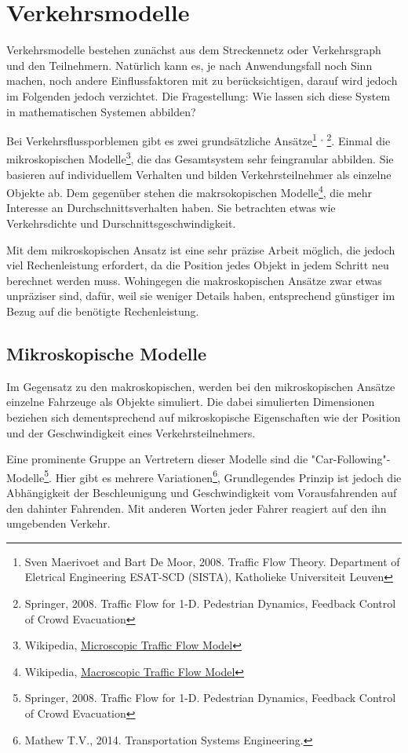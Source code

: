\section{Verkehrsmodelle}

Verkehrsmodelle bestehen zunächst aus dem Streckennetz oder Verkehrsgraph und den Teilnehmern. Natürlich kann es, je nach Anwendungsfall noch Sinn machen, noch andere Einflussfaktoren mit zu berücksichtigen, darauf wird jedoch im Folgenden jedoch verzichtet. Die Fragestellung: Wie lassen sich diese System in mathematischen Systemen abbilden?

Bei Verkehrsflussporblemen gibt es zwei grundsätzliche Ansätze\footnote{Sven Maerivoet and Bart De Moor, 2008. Traffic Flow Theory. Department of Eletrical Engineering ESAT-SCD (SISTA), Katholieke Universiteit Leuven}
\textsuperscript{,}
\footnote{Springer, 2008. Traffic Flow for 1-D. Pedestrian Dynamics, Feedback Control of Crowd Evacuation}. Einmal die mikroskopischen Modelle\footnote{Wikipedia, \href{https://en.wikipedia.org/wiki/Microscopic\_traffic\_flow\_model}{Microscopic Traffic Flow Model}}, die das Gesamtsystem sehr feingranular abbilden. Sie basieren auf individuellem Verhalten und bilden Verkehrsteilnehmer als einzelne Objekte ab.
Dem gegenüber stehen die makrsokopischen Modelle\footnote{Wikipedia, \href{https://en.wikipedia.org/wiki/Macroscopic\_traffic\_flow\_model}{Macroscopic Traffic Flow Model}}, die mehr Interesse an Durchschnittsverhalten haben. Sie betrachten etwas wie Verkehrsdichte und Durschnittsgeschwindigkeit.

Mit dem mikroskopischen Ansatz ist eine sehr präzise Arbeit möglich, die jedoch viel Rechenleistung erfordert, da die Position jedes Objekt in jedem Schritt neu berechnet werden muss. Wohingegen die makroskopischen Ansätze zwar etwas unpräziser sind, dafür, weil sie weniger Details haben, entsprechend günstiger im Bezug auf die benötigte Rechenleistung.


\subsection{Mikroskopische Modelle}
Im Gegensatz zu den makroskopischen, werden bei den mikroskopischen Ansätze einzelne Fahrzeuge als Objekte simuliert. Die dabei simulierten Dimensionen beziehen sich dementsprechend auf mikroskopische Eigenschaften wie der Position und der Geschwindigkeit eines Verkehrsteilnehmers.

Eine prominente Gruppe an Vertretern dieser Modelle sind die "Car-Following"-Modelle\footnote{Springer, 2008. Traffic Flow for 1-D. Pedestrian Dynamics, Feedback Control of Crowd Evacuation}. Hier gibt es mehrere Variationen\footnote{Mathew T.V., 2014. Transportation Systems Engineering.}, Grundlegendes Prinzip ist jedoch die Abhängigkeit der Beschleunigung und Geschwindigkeit vom Vorausfahrenden auf den dahinter Fahrenden. Mit anderen Worten jeder Fahrer reagiert auf den ihn umgebenden Verkehr.

